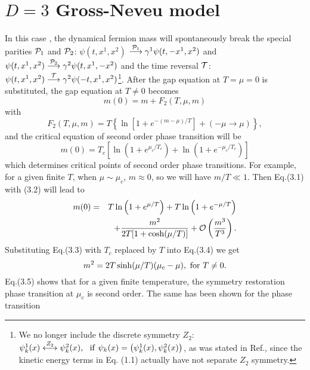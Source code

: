 \documentclass[a4paper,eqsecnum]{revtex4}
\begin{document}
\section{$D=3$ Gross-Neveu model\label{sec:3D}}
\indent  In this case \cite{kn:16}, the dynamical fermion 
mass will spontaneously break the special parities ${\cal P}_1$ and ${\cal P}_2$: 
$\psi(t, x^1, x^2)$ $\stackrel{{\cal P}_1}{\longrightarrow}\gamma^1\psi(t,-x^1, 
x^2)$ and $\psi(t, x^1, x^2)\stackrel{{\cal P}_2}{\longrightarrow}
\gamma^2\psi(t,x^1, -x^2)$ and the time reversal ${\cal T}$: 
$\psi(t, x^1, x^2)\stackrel{{\cal T}}{\longrightarrow}
\gamma^2\psi(-t,x^1, x^2)$\footnote{We no longer include the discrete symmetry $Z_2$: $\psi^1_k(x)\stackrel{Z_2}{\longleftrightarrow}\psi^2_k(x), \ \ {\rm if} \
\psi_k(x)=\left(\psi^1_k(x),\psi^2_k(x) \right)$, as was stated in 
Ref.\cite{kn:16}, since the kinetic energy terms in Eq. (1.1) actually have not 
separate $Z_2$ symmetry.}. After the gap equation at $T=\mu=0$ is substituted,
the gap equation at $T\neq 0$ becomes 
\begin{equation}
m(0)=m+F_2(T,\mu,m)
\end{equation}%
with
\begin{equation}
F_2(T,\mu,m)= T\left\{\ln \left[1+e^{-(m-\mu)/T}\right]+
                  (-\mu\to \mu)\right\},
\end{equation}%
and the critical equation of second order phase transition will be
\begin{equation}
m(0)= T_c\left[\ln (1+e^{\mu_c/T_c})+
                  \ln (1+e^{-\mu_c/T_c})\right]
\end{equation}%
which determines critical points of second order phase transitions.  For example, for a given finite $T$, when $\mu\sim \mu_c$, $m\approx 0$, so we will 
have $m/T \ll 1$.  Then  Eq.(3.1) with (3.2) will lead to 
\begin{eqnarray}
m(0)&=&T\ln\left(1+e^{\mu/T}\right)+T\ln\left(1+e^{-\mu/T}\right)\nonumber \\
&&+\frac{m^2}{2T[1+\cosh(\mu/T)]}+{\cal O}\left(\frac{m^3}{T^3}\right).
\end{eqnarray}%
Substituting Eq.(3.3) with $T_c$ replaced by $T$ into Eq.(3.4) we get
\begin{equation}
m^2=2T\sinh(\mu/T)(\mu_c-\mu), \ {\rm for} \ T\neq 0.
\end{equation}%
Eq.(3.5) shows that for a given finite temperature, the symmetry restoration phase 
transition at $\mu_c$ is second order. The same has been shown for the phase transition 
\end{document}
